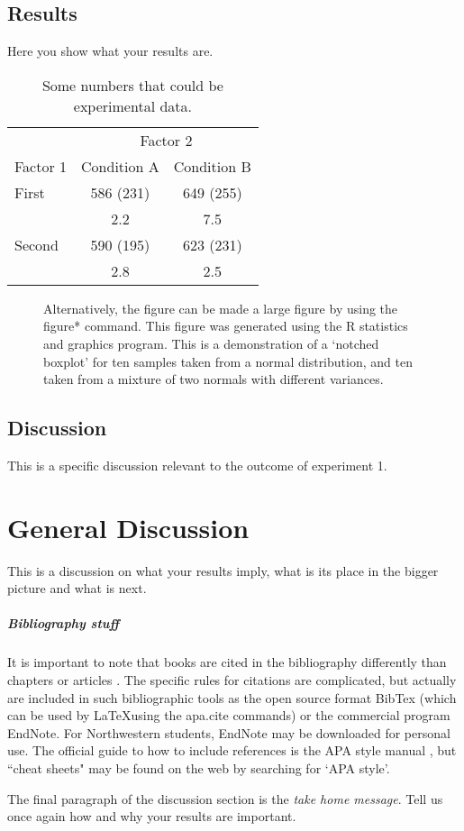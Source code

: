 \documentclass[man]{apa6} %
\begin{document}
\subsection{Results}

Here you show what your results are.

\begin{table}[tbp]
\caption{Some numbers that could be experimental data.}
\label{tab:tab2}
\begin{tabular}{lcc}\hline
          & \multicolumn{2}{c}{Factor 2} \\ \cline{2-3}
Factor 1  & Condition A  & Condition B   \\ \hline
First     & 586 (231)    & 649 (255)     \\
          &    2.2       &    7.5        \\
Second    & 590 (195)    & 623 (231)     \\
          &    2.8       &    2.5        \\ \hline
\end{tabular}
\end{table}


\begin{figure*}[htbp]
\begin{center}
\caption{Alternatively, the figure can be made a large figure by using the figure* command. This figure was generated using the R statistics and graphics program.  This is a demonstration of a `notched boxplot' for ten samples taken from a normal distribution, and ten taken from a mixture of two normals with different variances. }
\label{fig:bigfig}
\end{center}
\end{figure*}


\subsection{Discussion}

This is a specific discussion relevant to the outcome of experiment 1.

\section{General Discussion}
This is a discussion on what your results imply, what is its place in the bigger picture and what is next.%

\subparagraph{Bibliography stuff}
It is important to note that books \cite{leary} are cited in the bibliography differently than chapters \cite{rev:ea07} or articles \cite{killeen}.  The specific rules for citations are complicated, but actually  are included in such bibliographic tools as the open source format BibTex (which can be used by \LaTeX using the  apa.cite commands) or the commercial program EndNote.  For Northwestern students, EndNote may be downloaded for personal use.  The official guide to how to include references is the APA style manual \cite{apa:6}, but ``cheat sheets" may be found on the web by searching for `APA style'.

The final paragraph of the discussion section is the \emph{take home message}.  Tell us once again how and why your results are important.


\end{document}
